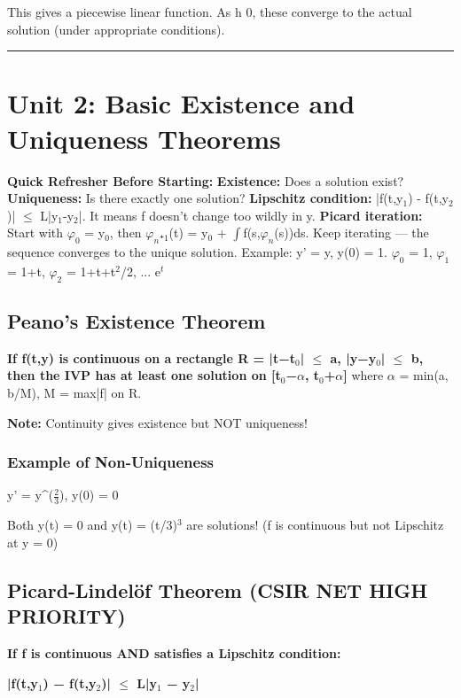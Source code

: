 \documentclass[12pt,a4paper,openany]{book}
\begin{document}
{{This gives a piecewise linear function. As h  0, these converge to the actual solution (under appropriate conditions).

\bigskip\noindent\rule{\textwidth}{0.4pt}\bigskip

\section{Unit 2: Basic Existence and Uniqueness Theorems}

\begin{prereqbox}
 \textbf{Quick Refresher Before Starting:}
\textbf{Existence:} Does a solution exist? \textbf{Uniqueness:} Is there exactly one solution?
\textbf{Lipschitz condition:} |f(t,y$_1$) - f(t,y$_2$)| $\leq$ L|y$_1$-y$_2$|. It means f doesn't change too wildly in y.
\textbf{Picard iteration:} Start with $\varphi_0$ = y$_0$, then $\varphi_n$₊$_1$(t) = y$_0$ + $\int$f(s,$\varphi_n$(s))ds. Keep iterating — the sequence converges to the unique solution.
Example: y' = y, y(0) = 1. $\varphi_0$ = 1, $\varphi_1$ = 1+t, $\varphi_2$ = 1+t+t$^2$/2, ...  e$^t$ 
\end{prereqbox}


\subsection{Peano's Existence Theorem}

\textbf{If f(t,y) is continuous on a rectangle R = {|t−t$_0$| $\leq$ a, |y−y$_0$| $\leq$ b}, then the IVP has at least one solution on [t$_0$−$\alpha$, t$_0$+$\alpha$]} where $\alpha$ = min(a, b/M), M = max|f| on R.

\textbf{Note:} Continuity gives existence but NOT uniqueness!

\subsubsection{Example of Non-Uniqueness}
y' = y^($\frac{2}{3}$), y(0) = 0

Both y(t) = 0 and y(t) = (t/3)$^3$ are solutions! (f is continuous but not Lipschitz at y = 0)

\subsection{Picard-Lindelöf Theorem  (CSIR NET HIGH PRIORITY)}

\textbf{If f is continuous AND satisfies a Lipschitz condition:}

\textbf{|f(t,y$_1$) − f(t,y$_2$)| $\leq$ L|y$_1$ − y$_2$|}

}}
\end{document}
